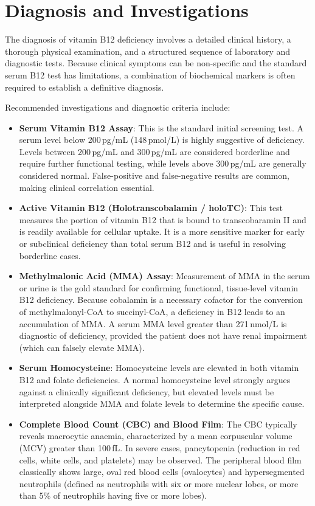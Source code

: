 \section*{Diagnosis and Investigations}
The diagnosis of vitamin B12 deficiency involves a detailed clinical history, a thorough physical examination, and a structured sequence of laboratory and diagnostic tests. Because clinical symptoms can be non-specific and the standard serum B12 test has limitations, a combination of biochemical markers is often required to establish a definitive diagnosis.

Recommended investigations and diagnostic criteria include:
\begin{itemize}
    \item \textbf{Serum Vitamin B12 Assay}: This is the standard initial screening test. A serum level below 200\,pg/mL (148\,pmol/L) is highly suggestive of deficiency. Levels between 200\,pg/mL and 300\,pg/mL are considered borderline and require further functional testing, while levels above 300\,pg/mL are generally considered normal. False-positive and false-negative results are common, making clinical correlation essential.
    \item \textbf{Active Vitamin B12 (Holotranscobalamin / holoTC)}: This test measures the portion of vitamin B12 that is bound to transcobaramin II and is readily available for cellular uptake. It is a more sensitive marker for early or subclinical deficiency than total serum B12 and is useful in resolving borderline cases.
    \item \textbf{Methylmalonic Acid (MMA) Assay}: Measurement of MMA in the serum or urine is the gold standard for confirming functional, tissue-level vitamin B12 deficiency. Because cobalamin is a necessary cofactor for the conversion of methylmalonyl-CoA to succinyl-CoA, a deficiency in B12 leads to an accumulation of MMA. A serum MMA level greater than 271\,nmol/L is diagnostic of deficiency, provided the patient does not have renal impairment (which can falsely elevate MMA).
    \item \textbf{Serum Homocysteine}: Homocysteine levels are elevated in both vitamin B12 and folate deficiencies. A normal homocysteine level strongly argues against a clinically significant deficiency, but elevated levels must be interpreted alongside MMA and folate levels to determine the specific cause.
    \item \textbf{Complete Blood Count (CBC) and Blood Film}: The CBC typically reveals macrocytic anaemia, characterized by a mean corpuscular volume (MCV) greater than 100\,fL. In severe cases, pancytopenia (reduction in red cells, white cells, and platelets) may be observed. The peripheral blood film classically shows large, oval red blood cells (ovalocytes) and hypersegmented neutrophils (defined as neutrophils with six or more nuclear lobes, or more than 5\% of neutrophils having five or more lobes).

\end{itemize}
